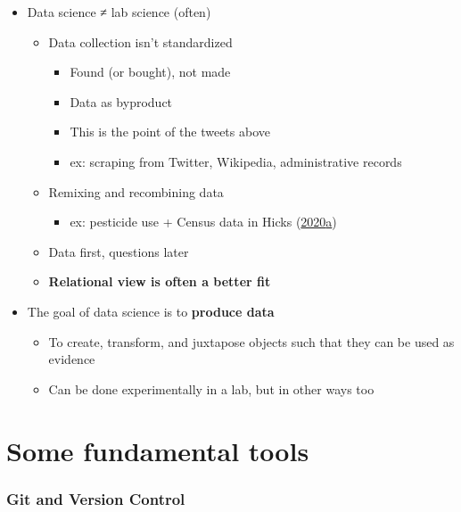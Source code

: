 \documentclass[
]{article}
\providecommand{\tightlist}{%
  \setlength{\itemsep}{0pt}\setlength{\parskip}{0pt}}
\begin{document}
\begin{itemize}
\tightlist
\item
  Data science ≠ lab science (often)

  \begin{itemize}
  \tightlist
  \item
    Data collection isn't standardized

    \begin{itemize}
    \tightlist
    \item
      Found (or bought), not made
    \item
      Data as byproduct
    \item
      This is the point of the tweets above
    \item
      ex: scraping from Twitter, Wikipedia, administrative records
    \end{itemize}
  \item
    Remixing and recombining data

    \begin{itemize}
    \tightlist
    \item
      ex: pesticide use + Census data in Hicks (\protect\hyperlink{ref-HicksCensusDemographicsChlorpyrifos2020}{2020}\protect\hyperlink{ref-HicksCensusDemographicsChlorpyrifos2020}{a})
    \end{itemize}
  \item
    Data first, questions later
  \item
    \textbf{Relational view is often a better fit}
  \end{itemize}
\item
  The goal of data science is to \textbf{produce data}

  \begin{itemize}
  \tightlist
  \item
    To create, transform, and juxtapose objects such that they can be used as evidence
  \item
    Can be done experimentally in a lab, but in other ways too
  \end{itemize}
\end{itemize}

\hypertarget{part-some-fundamental-tools}{%
\part{Some fundamental tools}\label{part-some-fundamental-tools}}

\hypertarget{git-and-version-control}{%
\section{Git and Version Control}\label{git-and-version-control}}
\end{document}
